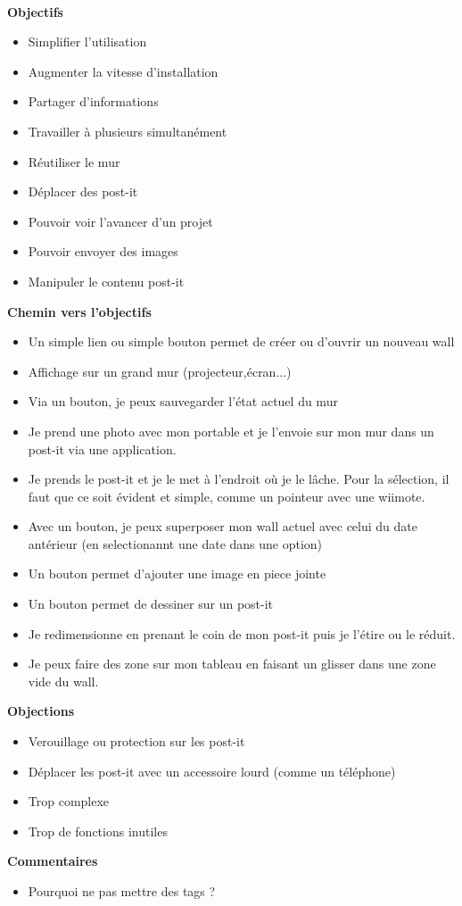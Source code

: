 \documentclass{article}
\begin{document}
\hfill\\
\textbf{Objectifs}
\begin{itemize}
  \item Simplifier l'utilisation
  \item Augmenter la vitesse d'installation
  \item Partager d'informations
  \item Travailler à plusieurs simultanément
  \item Réutiliser le mur
  \item Déplacer des post-it
  \item Pouvoir voir l'avancer d'un projet
  \item Pouvoir envoyer des images
  \item Manipuler le contenu post-it
\end{itemize}
\vspace{0.2cm}
\textbf{Chemin vers l'objectifs}
\begin{itemize}
  \item Un simple lien ou simple bouton permet de créer ou d'ouvrir un nouveau wall
  \item Affichage sur un grand mur (projecteur,écran...)
  \item Via un bouton, je peux sauvegarder l'état actuel du mur
  \item Je prend une photo avec mon portable et je l'envoie sur mon mur dans un post-it via une application.
  \item Je prends le post-it et je le met à l'endroit où je le lâche. Pour la sélection, il faut que ce soit évident et simple, comme un pointeur avec une wiimote.
  \item Avec un bouton, je peux superposer mon wall actuel avec celui du date antérieur (en selectionannt une date dans une option)
  \item Un bouton permet d'ajouter une image en piece jointe
  \item Un bouton permet de dessiner sur un post-it
  \item Je redimensionne en prenant le coin de mon post-it puis je l'étire ou le réduit.
  \item Je peux faire des zone sur mon tableau en faisant un glisser dans une zone vide du wall.
\end{itemize}
\vspace{0.2cm}
\textbf{Objections}
\begin{itemize}
  \item Verouillage ou protection sur les post-it
  \item Déplacer les post-it avec un accessoire lourd (comme un téléphone)
  \item Trop complexe
  \item Trop de fonctions inutiles
\end{itemize}
\vspace{0.2cm}
\textbf{Commentaires}
\begin{itemize}
  \item Pourquoi ne pas mettre des tags ?
\end{itemize}
\end{document}
